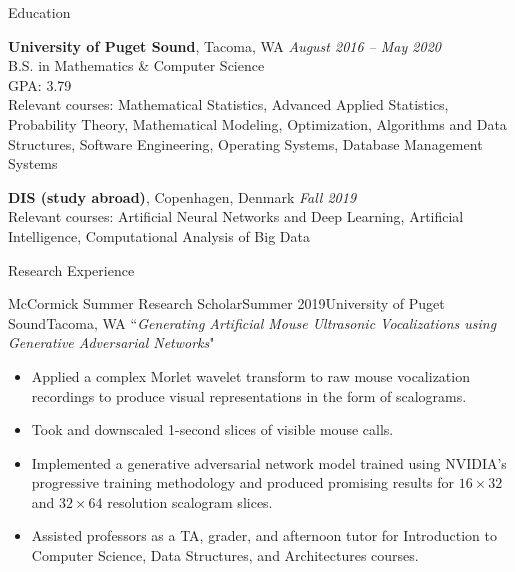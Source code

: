 \documentclass{resume} %
\begin{document}

\begin{rSection}{Education}

{\bf University of Puget Sound}, Tacoma, WA \hfill {\em August 2016 -- May 2020} \\ 
B.S. in Mathematics \& Computer Science \\
GPA: 3.79 \\
Relevant courses: Mathematical Statistics, Advanced Applied Statistics, Probability Theory, Mathematical Modeling, Optimization, Algorithms and Data Structures, Software Engineering, Operating Systems, Database Management Systems

{\bf DIS (study abroad)}, Copenhagen, Denmark \hfill {\em Fall 2019} \\
Relevant courses: Artificial Neural Networks and Deep Learning, Artificial Intelligence, Computational Analysis of Big Data

\end{rSection}



\begin{rSection}{Research Experience}

\begin{rSubsection}{McCormick Summer Research Scholar}{Summer 2019}{University of Puget Sound}{Tacoma, WA}
``\textit{Generating Artificial Mouse Ultrasonic Vocalizations using Generative Adversarial Networks}"
\renewcommand\labelitemi{$\cdot$}
\begin{itemize}
\setlength\itemsep{-0.25em}
\item Applied a complex Morlet wavelet transform to raw mouse vocalization recordings to produce visual representations in the form of scalograms.
\item Took and downscaled 1-second slices of visible mouse calls.
\item Implemented a generative adversarial network model trained using NVIDIA's progressive training methodology and produced promising results for $16 \times 32$ and $32 \times 64$ resolution scalogram slices. 
\item Assisted professors as a TA, grader, and afternoon tutor for Introduction to Computer Science, Data Structures, and Architectures courses. 
\end{itemize}
\end{rSubsection}

\end{rSection}
\end{document}
